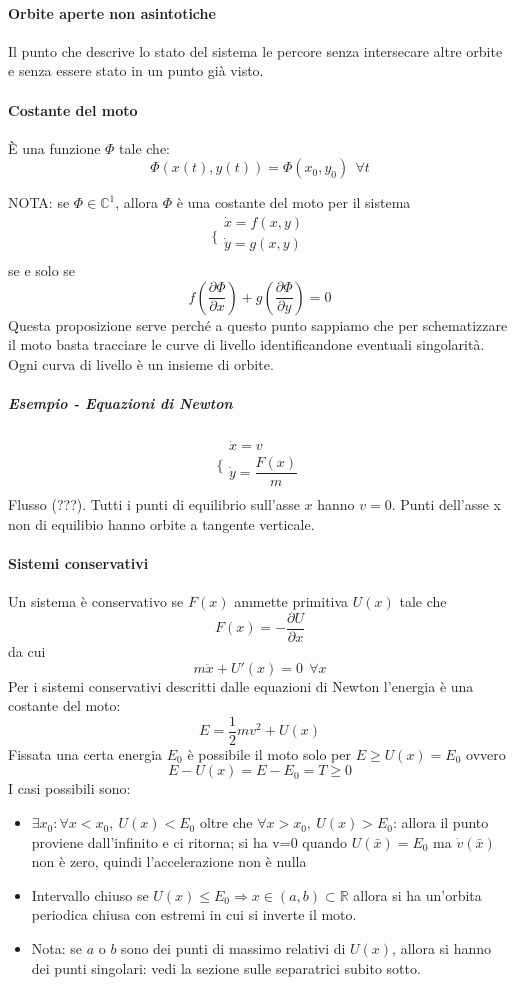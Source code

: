 \documentclass[a4paper,12pt]{article}
\begin{document}
\paragraph{Orbite aperte non asintotiche}
Il punto che descrive lo stato del sistema le percore senza intersecare altre orbite e senza essere stato in un punto già visto.
\paragraph{Costante del moto}
È una funzione $\Phi$ tale che:
$$\Phi(x(t), y(t)) = \Phi(x_0, y_0)\ \ \forall t$$

NOTA: se $\Phi \in \mathbb{C}^1$, allora $\Phi$ è una costante del moto per il sistema
$$\bigg\{ \begin{array}{l}
\dot{x} = f(x, y)\\
\dot{y} = g(x, y)\\
\end{array}$$
se e solo se
$$f\left(\dfrac{\partial \Phi}{\partial x}\right) + g\left(\dfrac{\partial \Phi}{\partial y}\right) = 0$$
Questa proposizione serve perché a questo punto sappiamo che per schematizzare il moto basta tracciare le curve di livello identificandone eventuali singolarità. Ogni curva di livello è un insieme di orbite.

\subparagraph{Esempio - Equazioni di Newton}
$$\Biggl\{ \begin{array}{l}
\dot{x} = v\\
\dot{y} = \dfrac{F(x)}{m}\\
\end{array}$$
Flusso (???).
Tutti i punti di equilibrio sull'asse $x$ hanno $v=0$.
Punti dell'asse x non di equilibio hanno orbite a tangente verticale.

\paragraph{Sistemi conservativi}
Un sistema è conservativo se $F(x)$ ammette primitiva $U(x)$ tale che $$F(x) = -\dfrac{\partial U}{\partial x}$$ da cui $$m\ddot{x} + U'(x) = 0 \ \ \forall x$$
Per i sistemi conservativi descritti dalle equazioni di Newton l'energia è una costante del moto:
$$ E = \dfrac{1}{2} mv^2+U(x)$$
Fissata una certa energia $E_0$ è possibile il moto solo per $E\geq U(x) = E_0$ ovvero $$E-U(x)=E-E_0 = T \geq 0$$
I casi possibili sono:
\begin{itemize}
	\item $\exists x_0: \forall x < x_0,\ U(x) < E_0$ oltre che $\forall x > x_0,\ U(x) > E_0$: allora il punto proviene dall'infinito e ci ritorna; si ha v=0 quando $U(\bar{x}) = E_0$ ma $\dot{v}(\bar{x})$ non è zero, quindi l'accelerazione non è nulla
	\item Intervallo chiuso se $U(x) \leq E_0 \Rightarrow x \in (a, b) \subset \mathbb{R}$ allora si ha un'orbita periodica chiusa con estremi in cui si inverte il moto.
	\item Nota: se $a$ o $b$ sono dei punti di massimo relativi di $U(x)$, allora si hanno dei punti singolari: vedi la sezione sulle separatrici subito sotto.
\end{itemize}
\end{document}
